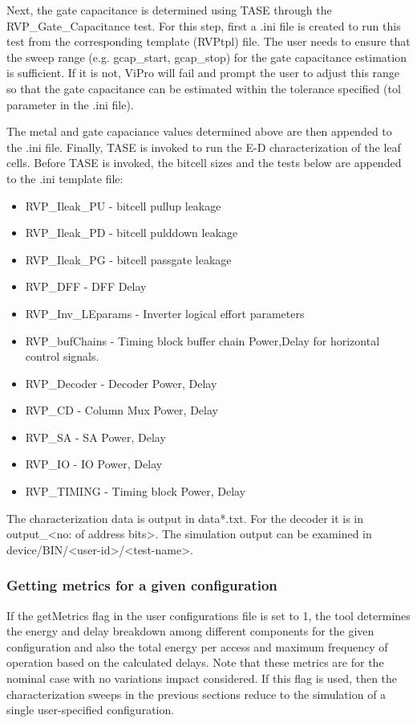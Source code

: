 Next, the gate capacitance is determined using TASE through the RVP\_Gate\_Capacitance test. For this step, first a .ini file is created to run this test from the corresponding template (RVPtpl) file. The user needs to ensure that the sweep range (e.g. gcap\_start, gcap\_stop) for the gate capacitance estimation is sufficient. If it is not, ViPro will fail and prompt the user to adjust this range so that the gate capacitance can be estimated within the tolerance specified (tol parameter in the .ini file).

The metal and gate capaciance values determined above are then appended to the .ini file. Finally, TASE is invoked to run the E-D characterization of the leaf cells. Before TASE is invoked, the bitcell sizes and the tests below are appended to the .ini template file:

\begin{itemize}
\item RVP\_Ileak\_PU - bitcell pullup leakage
\item RVP\_Ileak\_PD - bitcell pulddown leakage
\item RVP\_Ileak\_PG - bitcell passgate leakage
\item RVP\_DFF - DFF Delay
\item RVP\_Inv\_LEparams - Inverter logical effort parameters
\item RVP\_bufChains - Timing block buffer chain Power,Delay for horizontal control signals.
\item RVP\_Decoder - Decoder Power, Delay
\item RVP\_CD - Column Mux Power, Delay
\item RVP\_SA - SA Power, Delay
\item RVP\_IO - IO Power, Delay
\item RVP\_TIMING - Timing block Power, Delay
\end{itemize}

The characterization data is output in data*.txt. For the decoder it is in output\_\textless no: of address bits\textgreater. The simulation output can be examined in device/BIN/\textless user-id\textgreater /\textless test-name\textgreater.

\subsubsection{Getting metrics for a given configuration}
If the getMetrics flag in the user configurations file is set to 1, the tool determines the energy and delay breakdown among different components for the given configuration and also the total energy per access and maximum frequency of operation based on the calculated delays. Note that these metrics are for the nominal case with no variations impact considered. If this flag is used, then the characterization sweeps in the previous sections reduce to the simulation of a single user-specified configuration.


